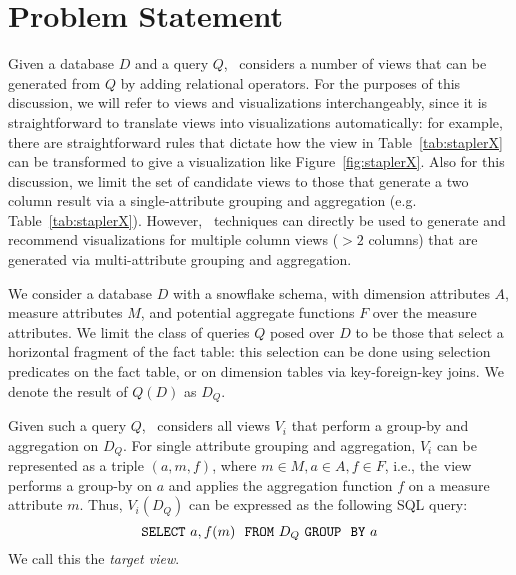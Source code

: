 

\section{Problem Statement}
\label{sec:problem_statement}

Given a database $D$ and a query $Q$, \SeeDB\ considers a number of views that
can be generated from $Q$ by adding relational operators.
For the purposes of this discussion, we will refer to views and visualizations
interchangeably, since it is straightforward to translate views into
visualizations automatically: for example, there are straightforward rules that
dictate how the view in Table~\ref{tab:staplerX} can be transformed to give a
visualization like Figure~\ref{fig:staplerX}.
Also for this discussion, we limit the set of candidate views to those
that generate a two column result via a single-attribute grouping and
aggregation (e.g. Table~\ref{tab:staplerX}). However, \SeeDB\ techniques can
directly be used to generate and recommend visualizations for
multiple column views ($> 2$ columns) that are generated via multi-attribute
grouping and aggregation.


We consider a database $D$ with a snowflake schema,
with dimension attributes $A$, measure attributes $M$, and potential
aggregate functions $F$ over the measure attributes.
We limit the class of queries $Q$ posed over $D$ to be
those that select a horizontal fragment of the fact table:
this selection can be done using selection predicates on the fact
table, or on dimension tables via key-foreign-key joins.
We denote the result of $Q(D)$ as $D_Q$.

Given such a query $Q$, \SeeDB\ considers all views $V_i$ that perform a
group-by and aggregation on $D_Q$.
For single
attribute grouping and aggregation, $V_i$ can be represented
as a triple $(a, m, f)$, where $m \in M, a \in A, f \in F$, i.e., the view performs a group-by on
$a$ and applies the aggregation function $f$ on a measure attribute $m$.
Thus, $V_i (D_Q)$ can be expressed as the following SQL query:
$${\tt SELECT \ } a, f(m) \ \ {\tt FROM} \  D_Q\  {\tt GROUP \ \ BY} \ a$$ We
call this the {\em target view}.

